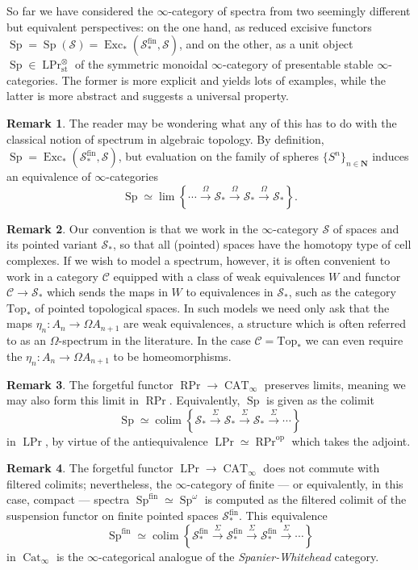 \documentclass[12pt]{article}
\theoremstyle{definition}
\newtheorem{remark}{Remark}[subsection]
\newcommand{\C}{\mathcal{C}}
\renewcommand{\S}{\mathcal{S}}
\newcommand{\NN}{\mathbf{N}}
\renewcommand{\i}{\infty}
\newcommand{\too}{\longrightarrow}
\newcommand{\op}{\mathrm{op}}
\DeclareMathOperator{\Cat}{Cat}
\DeclareMathOperator{\CAT}{CAT}
\DeclareMathOperator{\Exc}{Exc}
\DeclareMathOperator{\colim}{colim}
\DeclareMathOperator{\Prl}{LPr}
\DeclareMathOperator{\Prr}{RPr}
\DeclareMathOperator{\Sp}{Sp}
\newcommand{\st}{\mathrm{st}}
\DeclareMathOperator{\fin}{fin}
\begin{document}
So far we have considered the $\i$-category of spectra from two seemingly different but equivalent perspectives: on the one hand, as reduced excisive functors $\Sp=\Sp(\S)=\Exc_*(\S^{\fin}_*,\S)$, and on the other, as a unit object $\Sp\in\Prl^\otimes_{\st}$ of the symmetric monoidal $\i$-category of presentable stable $\i$-categories.
The former  is more explicit and yields lots of examples, while the latter is more abstract and suggests a universal property.

\begin{remark}
The reader may be wondering what any of this has to do with the classical notion of spectrum in algebraic topology.
By definition, $\Sp=\Exc_*(\S^{\fin}_*,\S)$, but evaluation on the family of spheres $\{S^n\}_{n\in\NN}$ induces an equivalence of $\i$-categories
\[
\Sp\simeq\lim\left\{\cdots\overset{\Omega}{\too}\S_*\overset{\Omega}{\too}\S_*\overset{\Omega}{\too}\S_*\right\}.
\]
\end{remark}

\begin{remark}
Our convention is that we work in the $\infty$-category $\S$ of spaces and its pointed variant $\S_*$, so that all (pointed) spaces have the homotopy type of cell complexes.
If we wish to model a spectrum, however, it is often convenient to work in a category $\C$ equipped with a class of weak equivalences $W$ and functor $\C\to\S_*$ which sends the maps in $W$ to equivalences in $\S_*$, such as the category $\mathrm{Top}_*$ of pointed topological spaces.
In such models we need only ask that the maps $\eta_n:A_n\to\Omega A_{n+1}$ are weak equivalences, a structure which is often referred to as an $\Omega$-spectrum in the literature.
In the case $\C=\mathrm{Top}_*$ we can even require the $\eta_n:A_n\to\Omega A_{n+1}$ to be homeomorphisms.
\end{remark}



\begin{remark}
The forgetful functor $\Prr\to\CAT_\i$ preserves limits, meaning we may also form this limit in $\Prr$. Equivalently, $\Sp$ is given as the colimit
\[
\Sp\simeq\colim\left\{\S_*\overset{\Sigma}{\too}\S_*\overset{\Sigma}{\too}\S_*\overset{\Sigma}{\too}\cdots\right\}
\]
in $\Prl$, by virtue of the antiequivalence $\Prl\simeq\Prr^{\op}$ which takes the adjoint.
\end{remark}

\begin{remark}
The forgetful functor $\Prl\to\CAT_\i$ does not commute with filtered colimits; nevertheless, the $\infty$-category of finite --- or equivalently, in this case, compact --- spectra $\Sp^\mathrm{fin}\simeq\Sp^\omega$ is computed as the filtered colimit of the suspension functor on finite pointed spaces $\S_*^\mathrm{fin}$.
This equivalence
\[
\Sp^\mathrm{fin}\simeq\colim\left\{\S_*^\mathrm{fin}\overset{\Sigma}{\too}\S_*^\mathrm{fin}\overset{\Sigma}{\too}\S_*^\mathrm{fin}\overset{\Sigma}{\too}\cdots\right\}
\]
in $\Cat_\i$ is the $\i$-categorical analogue of the {\em Spanier-Whitehead} category.
\end{remark}
\end{document}
